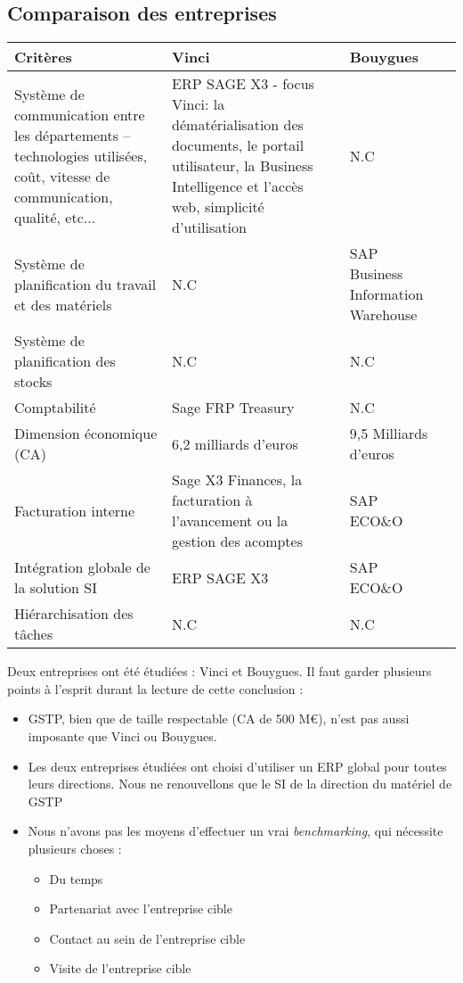 \subsection{Comparaison des entreprises}

\begin{longtable}{|m{3cm}|m{4cm}|m{4cm}|m{4cm}|}
\hline
Critères&
Vinci&Bouygues\\
\endhead
\hline
Système de communication entre les départements – technologies utilisées, 
coût, vitesse de communication, qualité, etc...
&
ERP SAGE X3 - focus Vinci: la dématérialisation des documents,
le portail utilisateur, la Business Intelligence et l’accès web,
simplicité d’utilisation
&
N.C
\\
\hline
Système de planification du travail et des matériels 
&
N.C
&
SAP Business Information Warehouse
\\
\hline
Système de planification des stocks
&
N.C
&
N.C
\\
\hline
Comptabilité
&
Sage FRP Treasury
&
N.C
\\
\hline
Dimension économique (CA)
&
6,2 milliards d’euros
&
9,5 Milliards d'euros
\\
\hline
Facturation interne
&
Sage X3 Finances, la facturation à l’avancement ou la gestion des acomptes
&
SAP ECO\&O
\\
\hline
Intégration globale de la solution SI
&
ERP SAGE X3
&
SAP ECO\&O
\\
\hline
Hiérarchisation des tâches
&
N.C
&
N.C
\\\hline
\end{longtable}

Deux entreprises ont été étudiées : Vinci et Bouygues. Il faut garder
plusieurs points à l'esprit durant la lecture de cette conclusion :

\begin{itemize}
\item GSTP, bien que de taille respectable (CA de 500 M\euro), n'est pas aussi
imposante que Vinci ou Bouygues.
\item Les deux entreprises étudiées ont choisi d'utiliser un ERP
global pour toutes leurs directions. Nous ne renouvellons que le SI de la
direction du matériel de GSTP
\item Nous n'avons pas les moyens d'effectuer un vrai {\sl benchmarking}, qui
nécessite plusieurs choses :
    \begin{itemize}
    \item Du temps
    \item Partenariat avec l'entreprise cible
    \item Contact au sein de l'entreprise cible
    \item Visite de l'entreprise cible
    \end{itemize}
\end{itemize}

\vfill
